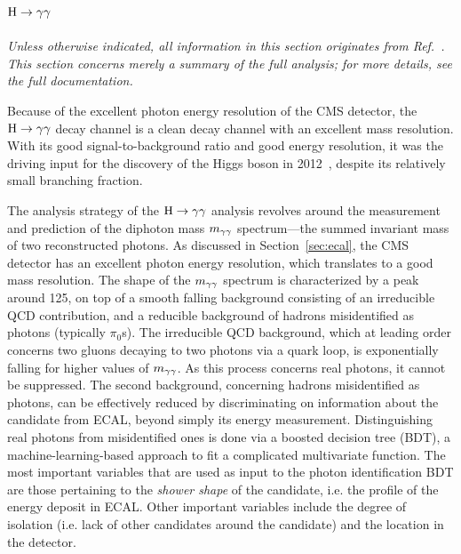 \subsection{\texorpdfstring{$\mathrm{H}\to\mathrm{\gamma}\mathrm{\gamma}$}{H to gamma gamma}}

\emph{%
Unless otherwise indicated, all information in this section originates from Ref.~\cite{Sirunyan:2018kta}. This section concerns merely a summary of the full analysis; for more details, see the full documentation.
}

Because of the excellent photon energy resolution of the CMS detector, the $\mathrm{H}\to\mathrm{\gamma}\mathrm{\gamma}$ decay channel is a clean decay channel with an excellent mass resolution.
% 
With its good signal-to-background ratio and good energy resolution, it was the driving input for the discovery of the Higgs boson in 2012~\cite{Aad:2012tfa,Chatrchyan:2012xdj,Chatrchyan:2013lba}, despite its relatively small branching fraction.


The analysis strategy of the $\mathrm{H}\to\mathrm{\gamma}\mathrm{\gamma}$ analysis revolves around the measurement and prediction of the diphoton mass $m_{\mathrm{\gamma}\mathrm{\gamma}}$ spectrum---the summed invariant mass of two reconstructed photons.
% 
As discussed in Section~\ref{sec:ecal}, the CMS detector has an excellent photon energy resolution, which translates to a good mass resolution.
% 
The shape of the $m_{\mathrm{\gamma}\mathrm{\gamma}}$ spectrum is characterized by a peak around 125\GeV, on top of a smooth falling background consisting of an irreducible QCD contribution, and a reducible background of hadrons misidentified as photons (typically $\pi_0$s).
% 
The irreducible QCD background, which at leading order concerns two gluons decaying to two photons via a quark loop, is exponentially falling for higher values of $m_{\mathrm{\gamma}\mathrm{\gamma}}$.
% 
As this process concerns real photons, it cannot be suppressed.
% 
The second background, concerning hadrons misidentified as photons, can be effectively reduced by discriminating on information about the candidate from ECAL, beyond simply its energy measurement.
% 
Distinguishing real photons from misidentified ones is done via a boosted decision tree (BDT), a machine-learning-based approach to fit a complicated multivariate function.
% 
The most important variables that are used as input to the photon identification BDT are those pertaining to the \textit{shower shape} of the candidate, i.e. the profile of the energy deposit in ECAL.
% 
Other important variables include the degree of isolation (i.e. lack of other candidates around the candidate) and the location in the detector.


